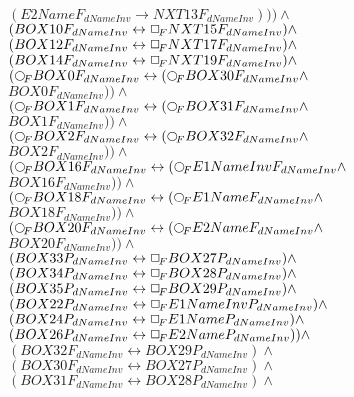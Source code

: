 \documentclass[a4paper,10pt]{article}
\begin{document}
 $ (E2NameF_{dNameInv} \rightarrow NXT13F_{dNameInv}))) \land $ \\ 
 $ (BOX10F_{dNameInv} \leftrightarrow  \Box_{\!F} NXT15F_{dNameInv}) \land $ \\ 
 $ (BOX12F_{dNameInv} \leftrightarrow  \Box_{\!F} NXT17F_{dNameInv}) \land $ \\ 
 $ (BOX14F_{dNameInv} \leftrightarrow  \Box_{\!F} NXT19F_{dNameInv}) \land $ \\ 
 $ ( \Rnext BOX0F_{dNameInv} \leftrightarrow ( \Rnext BOX30F_{dNameInv} \land $ \\ 
 $ BOX0F_{dNameInv})) \land $ \\ 
 $ ( \Rnext BOX1F_{dNameInv} \leftrightarrow ( \Rnext BOX31F_{dNameInv} \land $ \\ 
 $ BOX1F_{dNameInv})) \land $ \\ 
 $ ( \Rnext BOX2F_{dNameInv} \leftrightarrow ( \Rnext BOX32F_{dNameInv} \land $ \\ 
 $ BOX2F_{dNameInv})) \land $ \\ 
 $ ( \Rnext BOX16F_{dNameInv} \leftrightarrow ( \Rnext E1NameInvF_{dNameInv} \land $ \\ 
 $ BOX16F_{dNameInv})) \land $ \\ 
 $ ( \Rnext BOX18F_{dNameInv} \leftrightarrow ( \Rnext E1NameF_{dNameInv} \land $ \\ 
 $ BOX18F_{dNameInv})) \land $ \\ 
 $ ( \Rnext BOX20F_{dNameInv} \leftrightarrow ( \Rnext E2NameF_{dNameInv} \land $ \\ 
 $ BOX20F_{dNameInv})) \land $ \\ 
 $ (BOX33P_{dNameInv} \leftrightarrow  \Box_{\!F} BOX27P_{dNameInv}) \land $ \\ 
 $ (BOX34P_{dNameInv} \leftrightarrow  \Box_{\!F} BOX28P_{dNameInv}) \land $ \\ 
 $ (BOX35P_{dNameInv} \leftrightarrow  \Box_{\!F} BOX29P_{dNameInv}) \land $ \\ 
 $ (BOX22P_{dNameInv} \leftrightarrow  \Box_{\!F} E1NameInvP_{dNameInv}) \land $ \\ 
 $ (BOX24P_{dNameInv} \leftrightarrow  \Box_{\!F} E1NameP_{dNameInv}) \land $ \\ 
 $ (BOX26P_{dNameInv} \leftrightarrow  \Box_{\!F} E2NameP_{dNameInv})) \land $ \\ 
 $ (BOX32F_{dNameInv} \leftrightarrow BOX29P_{dNameInv}) \land $ \\ 
 $ (BOX30F_{dNameInv} \leftrightarrow BOX27P_{dNameInv}) \land $ \\ 
 $ (BOX31F_{dNameInv} \leftrightarrow BOX28P_{dNameInv}) \land $ \\ 
\end{document}

